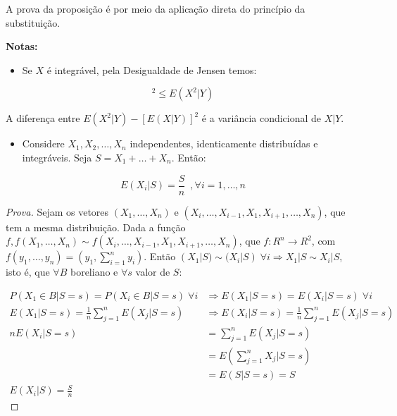 \documentclass[
]{article}
\providecommand{\tightlist}{%
  \setlength{\itemsep}{0pt}\setlength{\parskip}{0pt}}
\theoremstyle{definition}
\theoremstyle{definition}
\theoremstyle{definition}
\theoremstyle{definition}
\theoremstyle{remark}
\begin{document}
A prova da proposição é por meio da aplicação direta do princípio da substituição.

\textbf{Notas:}

\begin{itemize}
\tightlist
\item
  Se \(X\) é integrável, pela Desigualdade de Jensen temos:
\end{itemize}

\begin{equation*}
[E(X|Y)]^{2} \le E(X^{2}|Y)
\end{equation*}

A diferença entre \(E(X^{2}|Y) - [E(X|Y)]^{2}\) é a variância condicional de \(X|Y\).

\begin{itemize}
\tightlist
\item
  Considere \(X_{1},X_{2},\ldots,X_{n}\) independentes, identicamente distribuídas e integráveis. Seja \(S = X_{1} + \ldots + X_{n}\). Então:
\end{itemize}

\begin{equation*}
E(X_{i}|S) = \frac{S}{n} \,\,\, ,\forall i = 1,\ldots,n
\end{equation*}

\begin{proof}[Prova]
Sejam os vetores \((X_{1},\ldots,X_{n})\) e \((X_{i},\ldots,X_{i-1},X_{1},X_{i+1},\ldots,X_{n})\), que tem a mesma distribuição. Dada a função \(f, f(X_{1},\ldots,X_{n}) \sim f(X_{i},\ldots,X_{i-1},X_{1},X_{i+1},\ldots,X_{n})\), que \(f:R^{n} \to R^{2}\), com \(f(y_{1},\ldots,y_{n}) = \left(y_{1},\sum_{i=1}^{n}y_{i}\right)\). Então \((X_{1}|S) \sim (X_{i}|S) \; \forall i \Rightarrow X_{1}|S \sim X_{i}|S\), isto é, que \(\forall B\) boreliano e \(\forall s\) valor de \(S\):

\begin{align*}
P(X_{1} \in B|S = s) = P(X_{i} \in B|S = s) \; \forall i &\Rightarrow E(X_{1}|S = s) = E(X_{i}|S = s) \; \forall i \\
E(X_{1}|S = s) = \frac{1}{n}\sum_{j=1}^{n}E(X_{j}|S = s) &\Rightarrow E(X_{i}|S = s) = \frac{1}{n}\sum_{j=1}^{n}E(X_{j}|S = s) \\
nE(X_{i}|S = s) &= \sum_{j=1}^{n}E(X_{j}|S = s) \\
&= E\left(\sum_{j=1}^{n}X_{j}|S = s\right) \\
&= E(S|S = s) = S \\
E(X_{i}|S) = \frac{S}{n}
\end{align*}
\end{proof}
\end{document}
